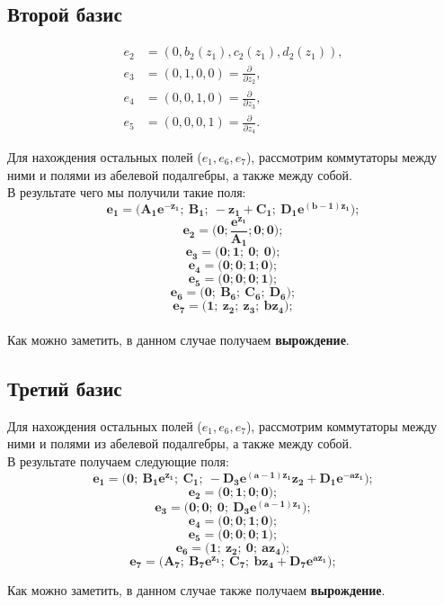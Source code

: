 \documentclass[12pt]{article}
\begin{document}
\subsection{Второй базис} 
\begin{align*}
e_2 &= (0,b_2(z_1),c_2(z_1),d_2(z_1)), \\
e_3 &= (0,1,0,0) = \frac{\partial}{\partial z_2}, \\
e_4 &= (0,0,1,0) = \frac{\partial}{\partial z_3}, \\
e_5 &= (0,0,0,1) = \frac{\partial}{\partial z_4}. 
\end{align*}

Для нахождения остальных полей (\( e_1, e_6, e_7 \)), рассмотрим коммутаторы между ними и полями из абелевой подалгебры, а также между собой. \\

В результате чего мы получили такие поля:
\[
\boldsymbol{e_1 = \big( A_1e^{-z_1};\ B_1;\ -z_1 + C_1;\ D_1e^{(b - 1)z_1}\big);}
\]
\[
\boldsymbol{e_2 = \big( 0; \frac{e^{z_1}}{A_1}; 0; 0\big);}
\]
\[
\boldsymbol{e_3 = \big( 0; 1;\ 0;\ 0 \big);}
\]
\[
\boldsymbol{e_4 = \big( 0; 0; 1; 0 \big);}
\]
\[
\boldsymbol{e_5 = \big( 0; 0; 0; 1 \big);}
\]
\[
\boldsymbol{e_6 = \big( 0;\ B_6;\ C_6;\ D_6 \big);}
\]
\[
\boldsymbol{e_7 = \big( 1;\ z_2;\ z_3;\ bz_4 \big);}
\]\\
Как можно заметить, в данном случае получаем \textbf{вырождение}.

\subsection{Третий базис} 
Для нахождения остальных полей (\( e_1, e_6, e_7 \)), рассмотрим коммутаторы между ними и полями из абелевой подалгебры, а также между собой. \\

В результате получаем следующие поля:\\

\[
\boldsymbol{e_1 = \big( 0;\ B_1e^{z_1};\ C_1;\  -D_3e^{(a - 1)z_1}z_2 + D_1e^{-az_1}\big);}
\]
\[
\boldsymbol{e_2 = \big( 0; 1; 0; 0\big);}
\]
\[
\boldsymbol{e_3 = \big( 0; 0;\ 0;\ D_3e^{(a - 1)z_1} \big);}
\]
\[
\boldsymbol{e_4 = \big( 0; 0; 1; 0 \big);}
\]
\[
\boldsymbol{e_5 = \big( 0; 0; 0; 1 \big);}
\]
\[
\boldsymbol{e_6 = \big( 1;\ z_2;\ 0;\ az_4 \big);}
\]
\[
\boldsymbol{e_7 = \big( A_7;\ B_7e^{z_1};\ C_7;\ bz_4 + D_7e^{az_1} \big);}
\]

Как можно заметить, в данном случае также получаем \textbf{вырождение}.
\pagebreak
\end{document}
